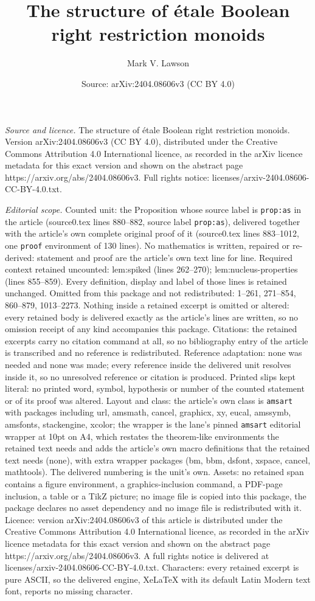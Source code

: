 \documentclass[10pt,a4paper]{amsart}
\title[The structure of \'etale Boolean right restriction monoids]{The structure of \'etale Boolean right restriction monoids}
\author{Mark V. Lawson}
\date{Source: arXiv:2404.08606v3 (CC BY 4.0)}
\begin{document}
\maketitle

\noindent\emph{Source and licence.} The structure of \'etale Boolean right restriction monoids. Version arXiv:2404.08606v3 (CC BY 4.0), distributed under the Creative Commons Attribution 4.0 International licence, as recorded in the arXiv licence metadata for this exact version and shown on the abstract page https://arxiv.org/abs/2404.08606v3. Full rights notice: licenses/arxiv-2404.08606-CC-BY-4.0.txt.\par\smallskip

\noindent\textit{Editorial scope.} Counted unit: the Proposition whose source label is \texttt{prop:as} in the article (source0.tex lines 880--882, source label \texttt{prop:as}), delivered together with the article's own complete original proof of it (source0.tex lines 883--1012, one \texttt{proof} environment of 130 lines). No mathematics is written, repaired or re-derived: statement and proof are the article's own text line for line. Required context retained uncounted: lem:spiked (lines 262--270); lem:nucleus-properties (lines 855--859). Every definition, display and label of those lines is retained unchanged. Omitted from this package and not redistributed: 1--261, 271--854, 860--879, 1013--2273. Nothing inside a retained excerpt is omitted or altered: every retained body is delivered exactly as the article's lines are written, so no omission receipt of any kind accompanies this package. Citations: the retained excerpts carry no citation command at all, so no bibliography entry of the article is transcribed and no reference is redistributed. Reference adaptation: none was needed and none was made; every reference inside the delivered unit resolves inside it, so no unresolved reference or citation is produced. Printed slips kept literal: no printed word, symbol, hypothesis or number of the counted statement or of its proof was altered. Layout and class: the article's own class is \texttt{amsart} with packages including url, amsmath, cancel, graphicx, xy, eucal, amssymb, amsfonts, stackengine, xcolor; the wrapper is the lane's pinned \texttt{amsart} editorial wrapper at 10pt on A4, which restates the theorem-like environments the retained text needs and adds the article's own macro definitions that the retained text needs (none), with extra wrapper packages (bm, bbm, dsfont, xspace, cancel, mathtools). The delivered numbering is the unit's own. Assets: no retained span contains a figure environment, a graphics-inclusion command, a PDF-page inclusion, a table or a TikZ picture; no image file is copied into this package, the package declares no asset dependency and no image file is redistributed with it. Licence: version arXiv:2404.08606v3 of this article is distributed under the Creative Commons Attribution 4.0 International licence, as recorded in the arXiv licence metadata for this exact version and shown on the abstract page https://arxiv.org/abs/2404.08606v3. A full rights notice is delivered at licenses/arxiv-2404.08606-CC-BY-4.0.txt. Characters: every retained excerpt is pure ASCII, so the delivered engine, XeLaTeX with its default Latin Modern text font, reports no missing character.
\end{document}
